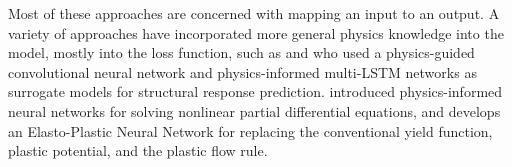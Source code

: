 \documentclass[11pt, authoryear]{elsarticle}
\renewcommand\textcolor[2]{#2}
\begin{document}
	\textcolor{red}{
		Most of these approaches are concerned with mapping an input to an output.
		A variety of approaches have incorporated more general physics knowledge into 
		the model, mostly into the loss function, such as \citet{zhang2020PhyCNN} and 
		\citet{zhang2020physics} who used a physics-guided convolutional neural network and 
		physics-informed multi-LSTM networks as surrogate models for structural response 
		prediction.  \citet{raissi2018deep} introduced physics-informed neural networks for solving nonlinear partial differential equations, and \citet{eghbalian2023physics} develops an Elasto-Plastic Neural Network for replacing the conventional yield function, plastic potential, and the plastic flow rule.
	}
	
\end{document}
